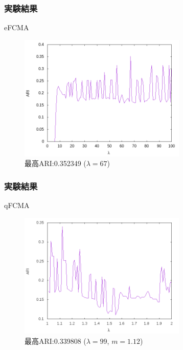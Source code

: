 \documentclass[13pt,dvipdfmx]{beamer}
\begin{document}
\begin{frame}\frametitle{実験結果}
  \begin{block}{eFCMA}
    \begin{figure}[htbp]
      \begin{center}
        \includegraphics[height=60mm]{efcma_ARI.png}
      \end{center}
      \captionsetup{labelformat=empty,labelsep=none}
      \caption{最高ARI:0.352349 ($\lambda=67$)}
    \end{figure}
  \end{block}
\end{frame}


\begin{frame}\frametitle{実験結果}
  \begin{block}{qFCMA}
    \begin{figure}[htbp]
      \begin{center}
        \includegraphics[height=60mm]{qfcma_ARI.png}
      \end{center}
      \captionsetup{labelformat=empty,labelsep=none}
      \caption{最高ARI:0.339808 ($\lambda=99$, $m=1.12$)}
    \end{figure}
  \end{block}
\end{frame}
\end{document}
